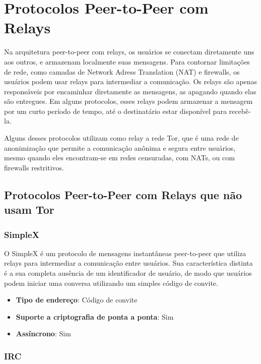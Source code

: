 \section{Protocolos Peer-to-Peer com Relays}

Na arquitetura peer-to-peer com relays, os usuários se conectam diretamente uns aos outros, e armazenam localmente suas mensagens. Para contornar limitações de rede, como camadas de Network Adress Translation (NAT) e firewalls, os usuários podem usar relays para intermediar a comunicação. Os relays são apenas responsáveis por encaminhar diretamente as mensagens, as apagando quando elas são entregues. Em alguns protocolos, esses relays podem armazenar a mensagem por um curto período de tempo, até o destinatário estar disponível para recebê-la.

Alguns desses protocolos utilizam como relay a rede Tor, que é uma rede de anonimização que permite a comunicação anônima e segura entre usuários, mesmo quando eles encontram-se em redes censuradas, com NATs, ou com firewalls restritivos.

\subsection{Protocolos Peer-to-Peer com Relays que não usam Tor}

\subsubsection{SimpleX}

O SimpleX é um protocolo de mensagens instantâneas peer-to-peer que utiliza relays para intermediar a comunicação entre usuários. Sua característica distinta é a sua completa ausência de um identificador de usuário, de modo que usuários podem iniciar uma conversa utilizando um simples código de convite. \cite{simplex}

\begin{itemize}
  \item \textbf{Tipo de endereço}: Código de convite
  \item \textbf{Suporte a criptografia de ponta a ponta}: Sim
  \item \textbf{Assíncrono}: Sim
\end{itemize}

\subsubsection{IRC}

